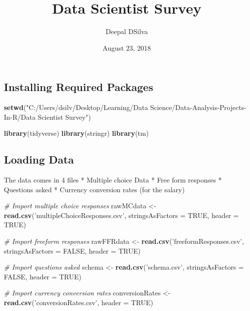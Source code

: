 \documentclass[]{article}
\title{Data Scientist Survey}
\author{Deepal DSilva}
\date{August 23, 2018}
\newenvironment{Shaded}{\begin{snugshade}}{\end{snugshade}}
\newcommand{\KeywordTok}[1]{\textcolor[rgb]{0.13,0.29,0.53}{\textbf{#1}}}
\newcommand{\DataTypeTok}[1]{\textcolor[rgb]{0.13,0.29,0.53}{#1}}
\newcommand{\StringTok}[1]{\textcolor[rgb]{0.31,0.60,0.02}{#1}}
\newcommand{\CommentTok}[1]{\textcolor[rgb]{0.56,0.35,0.01}{\textit{#1}}}
\newcommand{\OtherTok}[1]{\textcolor[rgb]{0.56,0.35,0.01}{#1}}
\newcommand{\NormalTok}[1]{#1}
\begin{document}
\maketitle

\subsection{Installing Required
Packages}\label{installing-required-packages}

\begin{Shaded}
\begin{Highlighting}[]
\KeywordTok{setwd}\NormalTok{(}\StringTok{"C:/Users/dsilv/Desktop/Learning/Data Science/Data-Analysis-Projects-In-R/Data Scientist Survey"}\NormalTok{)}

\KeywordTok{library}\NormalTok{(tidyverse)}
\KeywordTok{library}\NormalTok{(stringr)}
\KeywordTok{library}\NormalTok{(tm)}
\end{Highlighting}
\end{Shaded}

\subsection{Loading Data}\label{loading-data}

The data comes in 4 files * Multiple choice Data * Free form responses *
Questions asked * Currency conversion rates (for the salary)

\begin{Shaded}
\begin{Highlighting}[]
\CommentTok{# Import multiple choice responses}
\NormalTok{rawMCdata <-}\StringTok{ }\KeywordTok{read.csv}\NormalTok{(}\StringTok{'multipleChoiceResponses.csv'}\NormalTok{, }\DataTypeTok{stringsAsFactors =} \OtherTok{TRUE}\NormalTok{, }\DataTypeTok{header =} \OtherTok{TRUE}\NormalTok{)}

\CommentTok{# Import freeform responses}
\NormalTok{rawFFRdata <-}\StringTok{ }\KeywordTok{read.csv}\NormalTok{(}\StringTok{'freeformResponses.csv'}\NormalTok{, }\DataTypeTok{stringsAsFactors =} \OtherTok{FALSE}\NormalTok{, }\DataTypeTok{header =} \OtherTok{TRUE}\NormalTok{)}

\CommentTok{# Import questions asked}
\NormalTok{schema <-}\StringTok{ }\KeywordTok{read.csv}\NormalTok{(}\StringTok{'schema.csv'}\NormalTok{, }\DataTypeTok{stringsAsFactors =} \OtherTok{FALSE}\NormalTok{, }\DataTypeTok{header =} \OtherTok{TRUE}\NormalTok{)}

\CommentTok{# Import currency conversion rates}
\NormalTok{conversionRates <-}\StringTok{ }\KeywordTok{read.csv}\NormalTok{(}\StringTok{'conversionRates.csv'}\NormalTok{, }\DataTypeTok{header =} \OtherTok{TRUE}\NormalTok{)}
\end{Highlighting}
\end{Shaded}
\end{document}
